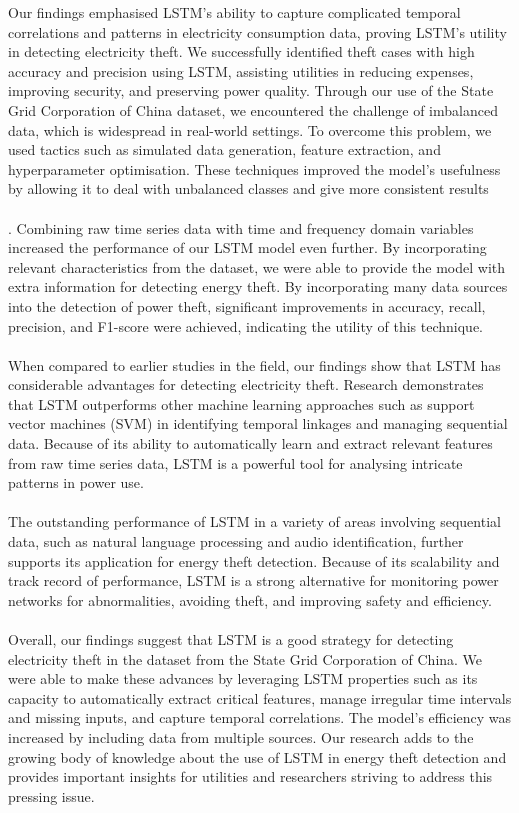 \documentclass{ieeeaccess}
\begin{document}
Our findings emphasised LSTM's ability to capture complicated temporal correlations and patterns in electricity consumption data, proving LSTM's utility in detecting electricity theft. We successfully identified theft cases with high accuracy and precision using LSTM, assisting utilities in reducing expenses, improving security, and preserving power quality.
Through our use of the State Grid Corporation of China dataset, we encountered the challenge of imbalanced data, which is widespread in real-world settings. To overcome this problem, we used tactics such as simulated data generation, feature extraction, and hyperparameter optimisation. These techniques improved the model's usefulness by allowing it to deal with unbalanced classes and give more consistent results
\\
\\.
Combining raw time series data with time and frequency domain variables increased the performance of our LSTM model even further. By incorporating relevant characteristics from the dataset, we were able to provide the model with extra information for detecting energy theft. By incorporating many data sources into the detection of power theft, significant improvements in accuracy, recall, precision, and F1-score were achieved, indicating the utility of this technique.
\\
\\
When compared to earlier studies in the field, our findings show that LSTM has considerable advantages for detecting electricity theft. Research demonstrates that LSTM outperforms other machine learning approaches such as support vector machines (SVM) in identifying temporal linkages and managing sequential data. Because of its ability to automatically learn and extract relevant features from raw time series data, LSTM is a powerful tool for analysing intricate patterns in power use.
\\
\\
The outstanding performance of LSTM in a variety of areas involving sequential data, such as natural language processing and audio identification, further supports its application for energy theft detection. Because of its scalability and track record of performance, LSTM is a strong alternative for monitoring power networks for abnormalities, avoiding theft, and improving safety and efficiency.
\\
\\
Overall, our findings suggest that LSTM is a good strategy for detecting electricity theft in the dataset from the State Grid Corporation of China. We were able to make these advances by leveraging LSTM properties such as its capacity to automatically extract critical features, manage irregular time intervals and missing inputs, and capture temporal correlations. The model's efficiency was increased by including data from multiple sources. Our research adds to the growing body of knowledge about the use of LSTM in energy theft detection and provides important insights for utilities and researchers striving to address this pressing issue.
\end{document}
